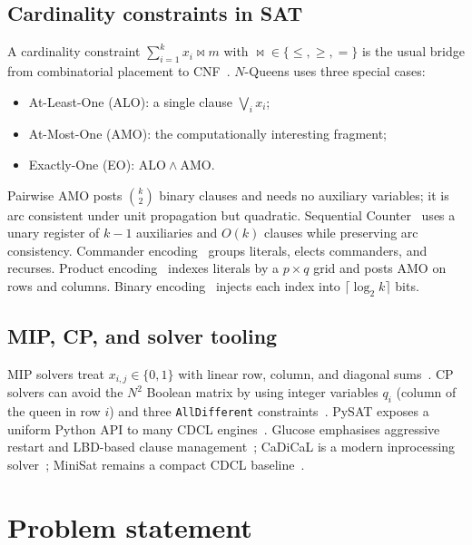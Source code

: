 \documentclass[a4paper,fleqn]{cas-sc}
\begin{document}
\subsection{Cardinality constraints in SAT}
A cardinality constraint $\sum_{i=1}^{k} x_i \bowtie m$ with $\bowtie\in\{\le,\ge,=\}$ is the usual bridge from combinatorial placement to CNF~\cite{biere2021handbook}.
$N$-Queens uses three special cases:
\begin{itemize}
    \item At-Least-One (ALO): a single clause $\bigvee_i x_i$;
    \item At-Most-One (AMO): the computationally interesting fragment;
    \item Exactly-One (EO): $\mathrm{ALO}\land\mathrm{AMO}$.
\end{itemize}
Pairwise AMO posts $\binom{k}{2}$ binary clauses and needs no auxiliary variables; it is arc consistent under unit propagation but quadratic.
Sequential Counter~\cite{sinz2005towards} uses a unary register of $k-1$ auxiliaries and $O(k)$ clauses while preserving arc consistency.
Commander encoding~\cite{klieber2007commander} groups literals, elects commanders, and recurses.
Product encoding~\cite{chen2010new} indexes literals by a $p\times q$ grid and posts AMO on rows and columns.
Binary encoding~\cite{frisch2005symmetry} injects each index into $\lceil\log_2 k\rceil$ bits.

\subsection{MIP, CP, and solver tooling}
MIP solvers treat $x_{i,j}\in\{0,1\}$ with linear row, column, and diagonal sums~\cite{gurobi2024,cplex2024}.
CP solvers can avoid the $N^2$ Boolean matrix by using integer variables $q_i$ (column of the queen in row $i$) and three \texttt{AllDifferent} constraints~\cite{regin1994filtering,perron2024ortools}.
PySAT exposes a uniform Python API to many CDCL engines~\cite{ignatiev2018pysat}.
Glucose emphasises aggressive restart and LBD-based clause management~\cite{audemard2018glucose}; CaDiCaL is a modern inprocessing solver~\cite{biere2019cadical}; MiniSat remains a compact CDCL baseline~\cite{een2003extensible}.

\section{Problem statement}
\label{sec:problem}
\end{document}
